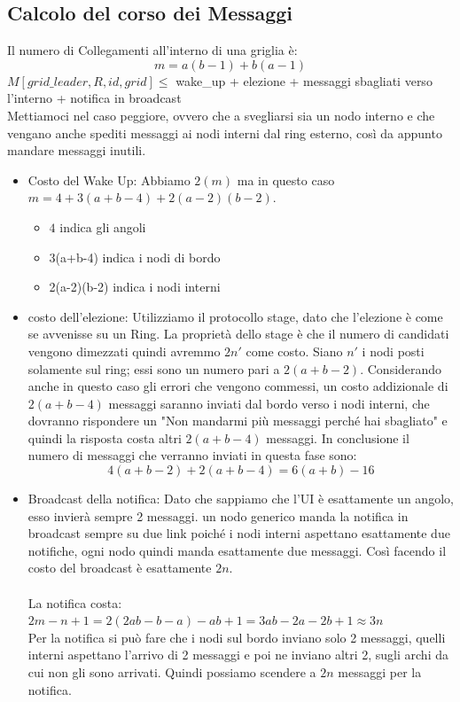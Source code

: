 \subsection{Calcolo del corso dei Messaggi}
Il numero di Collegamenti all'interno di una griglia è:
$$m=a(b-1)+b(a-1)$$ $M[grid\_leader,R,id,grid] \leq $ wake\_up + elezione +
messaggi sbagliati verso l'interno + notifica in broadcast\\
Mettiamoci nel caso peggiore, ovvero che a svegliarsi sia un nodo interno e che
vengano anche spediti messaggi ai nodi interni dal ring esterno, così da appunto
mandare messaggi inutili.
\begin{itemize}
    \item Costo del Wake Up: Abbiamo $2(m)$ ma in questo caso $m =
              4+3(a+b-4)+2(a-2)(b-2)$.
          \begin{itemize}
              \item $4$ indica gli angoli
              \item 3(a+b-4) indica i nodi di bordo
              \item 2(a-2)(b-2) indica i nodi interni
          \end{itemize}
    \item costo dell'elezione: Utilizziamo il protocollo stage, dato che
          l'elezione è come se avvenisse su un Ring. La proprietà dello stage è che il
          numero di candidati vengono dimezzati quindi avremmo $2n'$ come costo. Siano
          $n'$ i nodi posti solamente sul ring; essi sono un numero pari a $2(a+b-2)$.
          Considerando anche in questo caso gli errori che vengono commessi, un costo
          addizionale di $2(a+b-4)$ messaggi saranno inviati dal bordo verso i nodi
          interni, che dovranno rispondere un "Non mandarmi più messaggi perché hai
          sbagliato" e quindi la risposta costa altri $2(a+b-4)$ messaggi. In
          conclusione il numero di messaggi che verranno inviati in questa fase sono:
          $$4(a+b-2)+2(a+b-4) = 6(a+b)-16$$
    \item Broadcast della notifica: Dato che sappiamo che l'UI è esattamente un
          angolo, esso invierà sempre 2 messaggi. un nodo generico manda la notifica in
          broadcast sempre su due link poiché i nodi interni aspettano esattamente due
          notifiche, ogni nodo quindi manda esattamente due messaggi. Così facendo il
          costo del broadcast è esattamente $2n$.\\\\La notifica costa: $2m - n +1 = 2
              (2ab -b-a) -ab +1 = 3ab-2a-2b+1 \approx 3n$\\
          Per la notifica si può fare che i nodi sul bordo inviano solo 2
          messaggi, quelli interni aspettano l'arrivo di 2 messaggi e poi ne
          inviano altri 2, sugli archi da cui non gli sono arrivati. Quindi
          possiamo scendere a $2n$ messaggi per la notifica.
\end{itemize}
